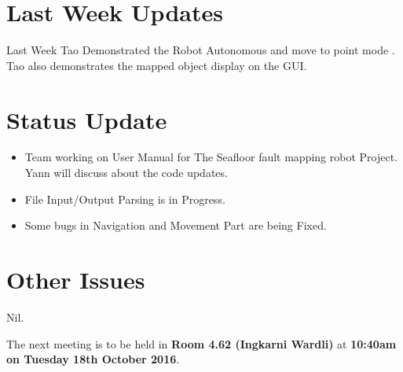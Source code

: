 \documentclass[11pt, a4paper]{article}
\begin{document}


\section{Last Week Updates }

Last Week Tao Demonstrated the Robot Autonomous and move to point mode . Tao also demonstrates the mapped object display on the GUI.



\section{Status Update}


\begin{itemize}

\item Team working on User Manual for The Seafloor fault mapping robot Project.\\






Yann will discuss about the code updates.
\item File Input/Output Parsing is in Progress.
\item Some bugs in Navigation and Movement Part are being Fixed.
\end{itemize}

\section{Other Issues}

Nil.



\vspace*{10pt}

\noindent The next meeting is to be held in {\bf Room 4.62 (Ingkarni Wardli)} at {\bf 10:40am on Tuesday 18th October 2016}.
\end{document}
